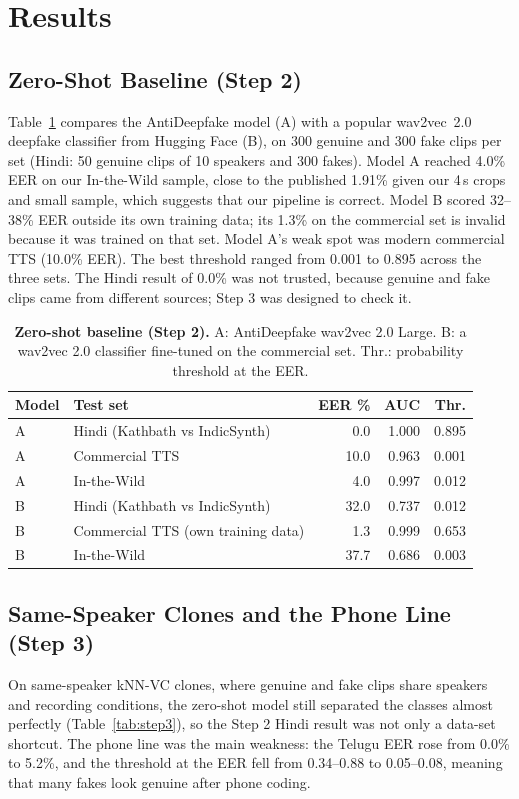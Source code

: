 \documentclass[10pt,a4paper,twocolumn]{article}
\begin{document}
\section{Results}
\subsection{Zero-Shot Baseline (Step 2)}
Table~\ref{tab:step2} compares the AntiDeepfake model (A) with a popular wav2vec~2.0 deepfake classifier from Hugging Face (B), on 300 genuine and 300 fake clips per set (Hindi: 50 genuine clips of 10 speakers and 300 fakes). Model A reached 4.0\% EER on our In-the-Wild sample, close to the published 1.91\% given our 4\,s crops and small sample, which suggests that our pipeline is correct. Model B scored 32--38\% EER outside its own training data; its 1.3\% on the commercial set is invalid because it was trained on that set. Model A's weak spot was modern commercial TTS (10.0\% EER). The best threshold ranged from 0.001 to 0.895 across the three sets. The Hindi result of 0.0\% was not trusted, because genuine and fake clips came from different sources; Step 3 was designed to check it.

\begin{table}[t]
\centering\footnotesize
\caption{\textbf{Zero-shot baseline (Step 2).} A: AntiDeepfake wav2vec 2.0 Large. B: a wav2vec 2.0 classifier fine-tuned on the commercial set. Thr.: probability threshold at the EER.}
\label{tab:step2}
\setlength{\tabcolsep}{4pt}
\begin{tabular}{@{}lp{}rrr@{}}
\toprule
\textbf{Model} & \textbf{Test set} & \textbf{EER \%} & \textbf{AUC} & \textbf{Thr.}\\
\midrule
A & Hindi (Kathbath vs IndicSynth) & 0.0 & 1.000 & 0.895\\
A & Commercial TTS & 10.0 & 0.963 & 0.001\\
A & In-the-Wild & 4.0 & 0.997 & 0.012\\
\midrule
B & Hindi (Kathbath vs IndicSynth) & 32.0 & 0.737 & 0.012\\
B & Commercial TTS (own training data) & 1.3 & 0.999 & 0.653\\
B & In-the-Wild & 37.7 & 0.686 & 0.003\\
\bottomrule
\end{tabular}
\end{table}

\subsection{Same-Speaker Clones and the Phone Line (Step 3)}
On same-speaker kNN-VC clones, where genuine and fake clips share speakers and recording conditions, the zero-shot model still separated the classes almost perfectly (Table~\ref{tab:step3}), so the Step 2 Hindi result was not only a data-set shortcut. The phone line was the main weakness: the Telugu EER rose from 0.0\% to 5.2\%, and the threshold at the EER fell from 0.34--0.88 to 0.05--0.08, meaning that many fakes look genuine after phone coding.
\end{document}
